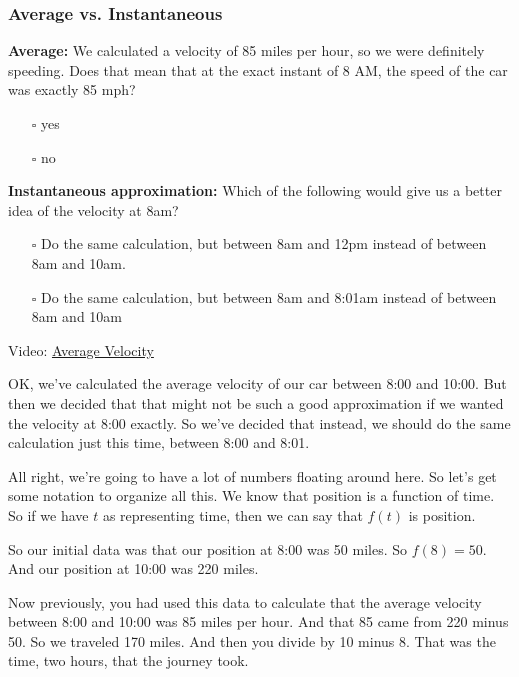 \documentclass[pdftex, brazil, 12pt, twoside]{article}
\begin{document}
\subsubsection{Average vs. Instantaneous}
\label{u1-what-avg-inst}

\begin{exercise}
  \textbf{Average:} We calculated a velocity of 85 miles per hour, so we were
  definitely speeding. Does that mean that at the exact instant of 8 AM, the speed
  of the car was exactly 85 mph?
\begin{itemize}[noitemsep]
\item[$\square$] yes
\item[$\square$] no
\end{itemize}
\end{exercise}

\begin{exercise}
  \textbf{Instantaneous approximation:} Which of the following would give us a
  better idea of the velocity at 8am?
\begin{itemize}[noitemsep]
\item[$\square$] Do the same calculation, but between 8am and 12pm instead of
  between 8am and 10am.
\item[$\square$] Do the same calculation, but between 8am and 8:01am instead
  of between 8am and 10am
\end{itemize}
\end{exercise}

Video: \href{https://www.youtube.com/watch?v=BBvacxW-h7M}{Average Velocity}

OK, we've calculated the average velocity
of our car between 8:00 and 10:00.
But then we decided that that might not
be such a good approximation if we wanted
the velocity at 8:00 exactly.
So we've decided that instead, we
should do the same calculation just this time,
between 8:00 and 8:01.

All right, we're going to have a lot of numbers floating around
here.
So let's get some notation to organize all this.
We know that position is a function of time.
So if we have $t$ as representing time,
then we can say that $f(t)$ is position.

So our initial data was that our position at 8:00 was 50 miles.
So $f(8) = 50$. And our position at 10:00 was 220 miles.

Now previously, you had used this data
to calculate that the average velocity between 8:00 and 10:00
was 85 miles per hour.
And that 85 came from 220 minus 50.
So we traveled 170 miles.
And then you divide by 10 minus 8.
That was the time, two hours, that the journey took.
\end{document}
